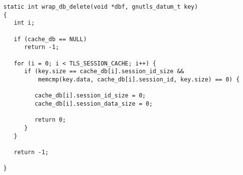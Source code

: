 \begin{verbatim}
static int wrap_db_delete(void *dbf, gnutls_datum_t key)
{
   int i;

   if (cache_db == NULL)
      return -1;

   for (i = 0; i < TLS_SESSION_CACHE; i++) {
      if (key.size == cache_db[i].session_id_size &&
          memcmp(key.data, cache_db[i].session_id, key.size) == 0) {

         cache_db[i].session_id_size = 0;
         cache_db[i].session_data_size = 0;

         return 0;
      }
   }

   return -1;

}

\end{verbatim}
